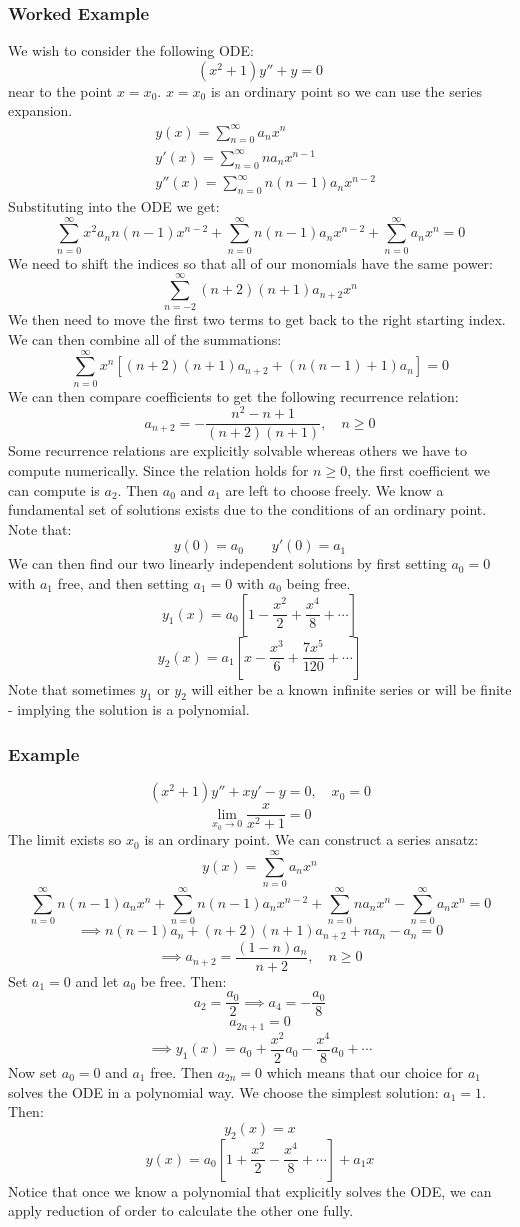 \documentclass[12pt]{article}
\begin{document}
\subsubsection{Worked Example}
We wish to consider the following ODE:
\[(x^2+1)y''+y=0\]
near to the point \(x=x_0\). \(x=x_0\) is an ordinary point so we can use the series expansion.
\begin{align*}
    &y(x)=\sum^\infty_{n=0}a_nx^n \\
    &y'(x)=\sum^\infty_{n=0}na_nx^{n-1} \\
    &y''(x)=\sum^\infty_{n=0}n(n-1)a_nx^{n-2}
\end{align*}
Substituting into the ODE we get:
\[\sum^\infty_{n=0}x^2a_nn(n-1)x^{n-2}+\sum^\infty_{n=0}n(n-1)a_nx^{n-2}+\sum^\infty_{n=0}a_nx^n=0\]
We need to shift the indices so that all of our monomials have the same power:
\[\sum^\infty_{n=-2}(n+2)(n+1)a_{n+2}x^{n}\]
We then need to move the first two terms to get back to the right starting index. We can then combine all of the summations:
\[\sum^\infty_{n=0}x^n[(n+2)(n+1)a_{n+2}+(n(n-1)+1)a_n]=0\]
We can then compare coefficients to get the following recurrence relation:
\[a_{n+2}=-\frac{n^2-n+1}{(n+2)(n+1)},\quad n\geq 0\]
Some recurrence relations are explicitly solvable whereas others we have to compute numerically. Since the relation holds for \(n\geq 0\), the first coefficient we can compute is \(a_{2}\). Then \(a_0\) and \(a_1\) are left to choose freely. We know a fundamental set of solutions exists due to the conditions of an ordinary point. Note that:
\[y(0)=a_0\qquad y'(0)=a_1\]
We can then find our two linearly independent solutions by first setting \(a_0=0\) with \(a_1\) free, and then setting \(a_1=0\) with \(a_0\) being free.
\[y_1(x)=a_0\left[1-\frac{x^2}{2}+\frac{x^4}{8}+\cdots\right]\]
\[y_2(x)=a_1\left[x-\frac{x^3}{6}+\frac{7x^5}{120}+\cdots\right]\]
Note that sometimes \(y_1\) or \(y_2\) will either be a known infinite series or will be finite - implying the solution is a polynomial.
\subsubsection*{Example}
\[(x^2+1)y''+xy'-y=0,\quad x_0=0\]
\[\lim_{x_0\to 0}\frac{x}{x^2+1}=0\]
The limit exists so \(x_0\) is an ordinary point. We can construct a series ansatz:
\[y(x)=\sum^\infty_{n=0}a_nx^n\]
\[\sum^\infty_{n=0}n(n-1)a_nx^n+\sum^\infty_{n=0}n(n-1)a_nx^{n-2}+\sum^\infty_{n=0}na_nx^n-\sum^\infty_{n=0}a_nx^n=0\]
\[\implies n(n-1)a_n+(n+2)(n+1)a_{n+2}+na_n-a_n=0\]
\[\implies a_{n+2}=\frac{(1-n)a_n}{n+2},\quad n\geq 0\]
Set \(a_1=0\) and let \(a_0\) be free. Then:
\[a_2=\frac{a_0}{2}\implies a_4=-\frac{a_0}{8}\]
\[a_{2n+1}=0\]
\[\implies y_1(x)=a_0+\frac{x^2}2{a_0-\frac{x^4}{8}a_0+\cdots}\]
Now set \(a_0=0\) and \(a_1\) free. Then \(a_{2n}=0\) which means that our choice for \(a_1\) solves the ODE in a polynomial way. We choose the simplest solution: \(a_1=1\). Then:
\[y_2(x)=x\]
\[y(x)=a_0\left[1+\frac{x^2}{2}-\frac{x^4}{8}+\cdots\right]+a_1x\]
Notice that once we know a polynomial that explicitly solves the ODE, we can apply reduction of order to calculate the other one fully.
\end{document}
